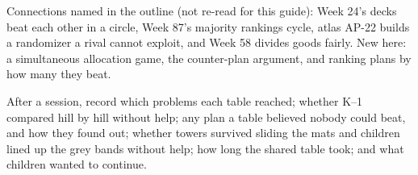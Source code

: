Connections named in the outline (not re-read for this guide): Week 24's decks beat each other in a circle, Week 87's majority rankings cycle, atlas AP-22 builds a randomizer a rival cannot exploit, and Week 58 divides goods fairly. New here: a simultaneous allocation game, the counter-plan argument, and ranking plans by how many they beat.

After a session, record which problems each table reached; whether K--1 compared hill by hill without help; any plan a table believed nobody could beat, and how they found out; whether towers survived sliding the mats and children lined up the grey bands without help; how long the shared table took; and what children wanted to continue.
